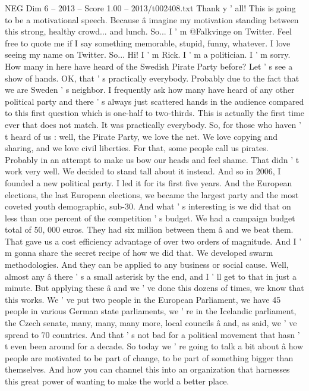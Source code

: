 \begin{textsample}{NEG Dim 6 – 2013 – Score 1.00 – 2013/t002408.txt}  \label{ex:f6_neg_042}
Thank y ' all!
This is going to be a motivational speech.
Because â imagine my motivation standing between this strong, healthy crowd... and lunch.
So...
I ' m @Falkvinge on Twitter.
Feel free to quote me if I say something memorable, stupid, funny, whatever.
I love seeing my name on Twitter.
So...
Hi!
I ' m Rick.
I ' m a politician.
I ' m sorry.
How many in here have heard of the Swedish Pirate Party before?
Let ' s see a show of hands.
OK, that ' s practically everybody.
Probably due to the fact that we are Sweden ' s neighbor.
I frequently ask how many have heard of any other political party and there ' s always just scattered hands in the audience compared to this first question which is one-half to two-thirds.
This is actually the first time ever that does not match.
It was practically everybody.
So, for those who haven ' t heard of us : well, the Pirate Party, we love the net.
We love copying and sharing, and we love civil liberties.
For that, some people call us pirates.
Probably in an attempt to make us bow our heads and feel shame.
That didn ' t work very well.
We decided to stand tall about it instead.
And so in 2006, I founded a new political party.
I led it for its first five years.
And the European elections, the last European elections, we became the largest party and the most coveted youth demographic, sub-30.
And what ' s interesting is we did that on less than one percent of the competition ' s budget.
We had a campaign budget total of 50, 000 euros.
They had six million between them â and we beat them.
That gave us a cost efficiency advantage of over two orders of magnitude.
And I ' m gonna share the secret recipe of how we did that.
We developed swarm methodologies.
And they can be applied to any business or social cause.
Well, almost any â there ' s a small asterisk by the end, and I ' ll get to that in just a minute.
But applying these â and we ' ve done this dozens of times, we know that this works.
We ' ve put two people in the European Parliament, we have 45 people in various German state parliaments, we ' re in the Icelandic parliament, the Czech senate, many, many, many more, local councils â and, as said, we ' ve spread to 70 countries.
And that ' s not bad for a political movement that hasn ' t even been around for a decade.
So today we ' re going to talk a bit about â how people are motivated to be part of change, to be part of something bigger than themselves.
And how you can channel this into an organization that harnesses this great power of wanting to make the world a better place.

\end{textsample}

